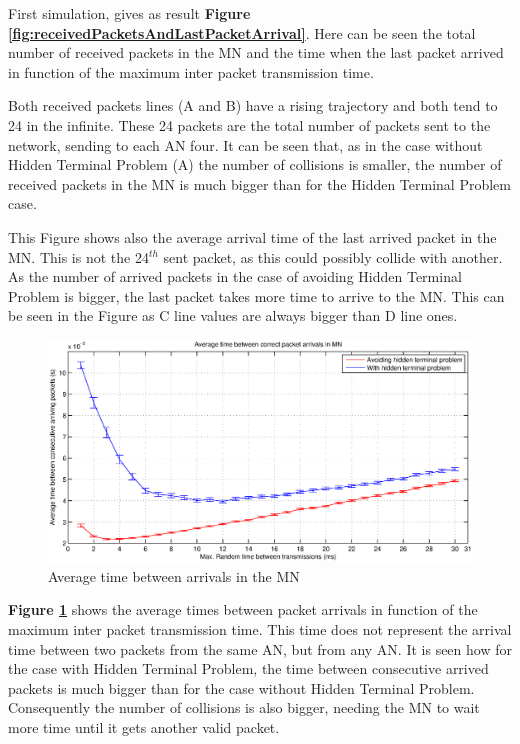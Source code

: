 First simulation, gives as result \textbf{Figure \ref{fig:receivedPacketsAndLastPacketArrival}}. Here can be seen the total number of received 
packets in the \ac{MN} and the time when the last packet arrived in function of the maximum inter packet transmission time.

Both received packets lines (A and B) have a rising trajectory and both tend to 24 in the infinite. These 24 packets are the total number of 
packets sent to the network, sending to each \ac{AN} four. It can be seen that, as in the case without Hidden Terminal Problem (A) the number 
of collisions is smaller, the number of received packets in the \ac{MN} is much bigger than for the Hidden Terminal Problem case.

This Figure shows also the average arrival time of the last arrived packet in the \ac{MN}. This is not the 24$^{th}$ sent packet, as this could 
possibly collide with another. As the number of arrived packets in the case of avoiding Hidden Terminal Problem is bigger, the last packet takes more time 
to arrive to the \ac{MN}. This can be seen in the Figure as C line values are always bigger than D line ones.

\begin{figure}[ht]
 \begin{center}
  \includegraphics[width=1\textwidth]{averageTimeBetweenArrivals.eps}
 \end{center}
 \caption{Average time between arrivals in the \ac{MN}}
 \label{fig:averageTimeBetweenArrivals}
\end{figure}

\textbf{Figure \ref{fig:averageTimeBetweenArrivals}} shows the average times between packet arrivals in function of the maximum inter packet 
transmission time. This time does not represent the arrival time between two packets from the same \ac{AN}, but from any \ac{AN}. It is seen 
how for the case with Hidden Terminal Problem, the time between consecutive arrived packets is much bigger than for the case without Hidden 
Terminal Problem. Consequently the number of collisions is also bigger, needing the \ac{MN} to wait more time until it gets another valid packet.

